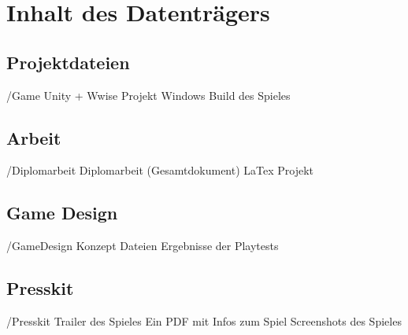 \chapter{Inhalt des Datenträgers}

\section{Projektdateien}
\begin{FileList}{/Game}
	 Unity + Wwise Projekt
	 Windows Build des Spieles
\end{FileList}

\section{Arbeit}
\begin{FileList}{/Diplomarbeit}
	 Diplomarbeit (Gesamtdokument) 
	 LaTex Projekt
\end{FileList}

\section{Game Design}
\begin{FileList}{/GameDesign}
	 Konzept Dateien
	 Ergebnisse der Playtests
\end{FileList}
 
\section{Presskit}
\begin{FileList}{/Presskit}
	 Trailer des Spieles
	 Ein PDF mit Infos zum Spiel
	 Screenshots des Spieles
\end{FileList}
